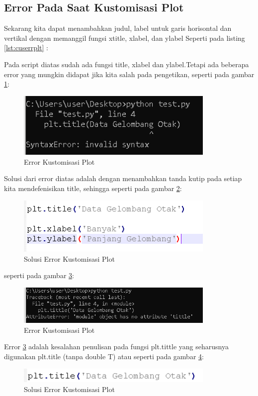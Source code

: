 \subsection{Error Pada Saat Kustomisasi Plot} 
Sekarang kita dapat menambahkan judul, label untuk garis horisontal dan vertikal dengan memanggil fungsi xtitle, xlabel, dan ylabel Seperti pada listing \ref{lst:cuserrplt} : 

Pada script diatas sudah ada fungsi title, xlabel dan ylabel.Tetapi ada beberapa error yang mungkin didapat jika kita salah pada pengetikan, seperti pada gambar \ref{fig:errcusplot}:
\begin{figure}[!htbp]
	\centerline{\includegraphics[width=0.85\textwidth]{figures/6/errcusplot.PNG}}
	\caption{Error Kustomisasi Plot}
	\label{fig:errcusplot}
\end{figure}       

Solusi dari error diatas adalah dengan menambahkan tanda kutip pada setiap kita mendefenisikan title, sehingga seperti pada gambar \ref{fig:solcusplot}:
\begin{figure}[!htbp]
	\centerline{\includegraphics[width=0.85\textwidth]{figures/6/solcusplot.PNG}}
	\caption{Solusi Error Kustomisasi Plot}
	\label{fig:solcusplot}
\end{figure}      

seperti pada gambar \ref{fig:errcusplt}:
\begin{figure}[!htbp]
	\centerline{\includegraphics[width=0.85\textwidth]{figures/6/errcusplt.PNG}}
	\caption{Error Kustomisasi Plot}
	\label{fig:errcusplt}
\end{figure}
Error \ref{fig:errcusplt} adalah kesalahan penulisan pada fungsi plt.tittle yang seharusnya digunakan plt.title (tanpa double T) atau seperti pada gambar \ref{fig:solcp}:
\begin{figure}[!htbp]
	\centerline{\includegraphics[width=0.85\textwidth]{figures/6/solcp.PNG}}
	\caption{Solusi Error Kustomisasi Plot}
	\label{fig:solcp}
\end{figure}

